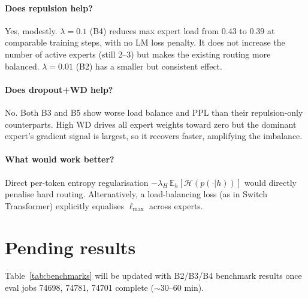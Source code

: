 \documentclass[11pt,a4paper]{article}
\begin{document}
\paragraph{Does repulsion help?}
Yes, modestly.  $\lambda{=}0.1$ (B4) reduces max expert load from 0.43 to 0.39
at comparable training steps, with no LM loss penalty.  It does not increase
the number of active experts (still 2--3) but makes the existing routing more
balanced.  $\lambda{=}0.01$ (B2) has a smaller but consistent effect.

\paragraph{Does dropout+WD help?}
No.  Both B3 and B5 show worse load balance and PPL than their repulsion-only
counterparts.  High WD drives all expert weights toward zero but the dominant
expert's gradient signal is largest, so it recovers faster, amplifying the imbalance.

\paragraph{What would work better?}
Direct per-token entropy regularisation
$-\lambda_H\,\mathbb{E}_h[\mathcal{H}(p(\cdot|h))]$ would directly penalise
hard routing.  Alternatively, a load-balancing loss (as in Switch Transformer)
explicitly equalises $\ell_\text{max}$ across experts.

\section{Pending results}

Table~\ref{tab:benchmarks} will be updated with B2/B3/B4 benchmark results
once eval jobs 74698, 74781, 74701 complete (${\sim}30$--$60$ min).
\end{document}
